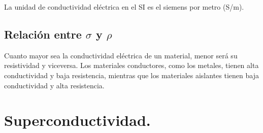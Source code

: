 \documentclass[12pt]{article}
\begin{document}
La unidad de conductividad eléctrica en el SI es el siemens por metro (S/m).

\subsection*{Relación entre $\sigma$ y $\rho$}

Cuanto mayor sea la conductividad eléctrica de un material, menor será su resistividad y viceversa. Los materiales conductores, como los metales, tienen alta conductividad y baja resistencia, mientras que los materiales aislantes tienen baja conductividad y alta resistencia.















\section{Superconductividad.}
\end{document}
